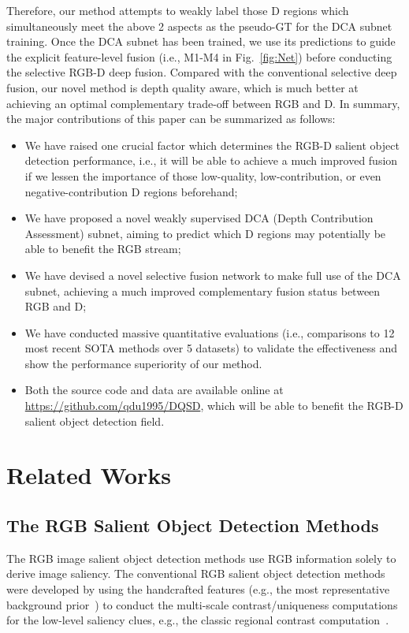 \documentclass[journal]{IEEEtran}
\begin{document}
Therefore, our method attempts to weakly label those D regions which simultaneously meet the above 2 aspects as the pseudo-GT for the DCA subnet training.
Once the DCA subnet has been trained, we use its predictions to guide the explicit feature-level fusion (i.e., M1-M4 in Fig.~\ref{fig:Net}) before conducting the selective RGB-D deep fusion.
Compared with the conventional selective deep fusion, our novel method is depth quality aware, which is much better at achieving an optimal complementary trade-off between RGB and D.
In summary, the major contributions of this paper can be summarized as follows:
\begin{itemize}
    \item
    We have raised one crucial factor which determines the RGB-D salient object detection performance, i.e., it will be able to achieve a much improved fusion if we lessen the importance of those low-quality, low-contribution, or even negative-contribution D regions beforehand;
	\item
    We have proposed a novel weakly supervised DCA (Depth Contribution Assessment) subnet, aiming to predict which D regions may potentially be able to benefit the RGB stream;
    \item
    We have devised a novel selective fusion network to make full use of the DCA subnet, achieving a much improved complementary fusion status between RGB and D;
    \item
    We have conducted massive quantitative evaluations (i.e., comparisons to 12 most recent SOTA methods over 5 datasets) to validate the effectiveness and show the performance superiority of our method.
    \item
    Both the source code and data are available online at \url{https://github.com/qdu1995/DQSD}, which will be able to benefit the RGB-D salient object detection field.

\end{itemize}

\section{Related Works}
\subsection{The RGB Salient Object Detection Methods}
The RGB image salient object detection methods use RGB information solely to derive image saliency.
The conventional RGB salient object detection methods~\cite{jiang2013salient,peng2016salient,cong2017co,huo2018semisupervised} were developed by using the handcrafted features (e.g., the most representative background prior~\cite{wei2012geodesic}) to conduct the multi-scale contrast/uniqueness computations for the low-level saliency clues, e.g., the classic regional contrast computation~\cite{cheng2014global}.
\end{document}
